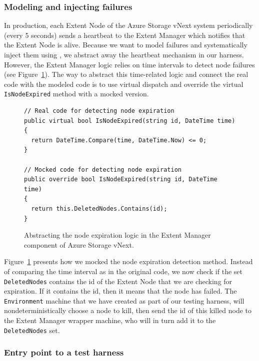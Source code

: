 \subsubsection{Modeling and injecting failures}
\label{sec:method:model:failures}

In production, each Extent Node of the Azure Storage vNext system periodically (every 5 seconds) sends a heartbeat to the Extent Manager which notifies that the Extent Node is alive. Because we want to model failures and systematically inject them using \psharp, we abstract away the heartbeat mechanism in our harness. However, the Extent Manager logic relies on time intervals to detect node failures (see Figure~\ref{fig:expiration}). The way to abstract this time-related logic and connect the real code with the modeled code is to use virtual dispatch and override the virtual \texttt{IsNodeExpired} method with a mocked version.

\begin{figure}[t]
\begin{lstlisting}
// Real code for detecting node expiration
public virtual bool IsNodeExpired(string id, DateTime time)
{
  return DateTime.Compare(time, DateTime.Now) <= 0;
}

// Mocked code for detecting node expiration
public override bool IsNodeExpired(string id, DateTime time)
{
  return this.DeletedNodes.Contains(id);
}
\end{lstlisting}
\vspace{-2mm}
\caption{Abstracting the node expiration logic in the Extent Manager component of Azure Storage vNext.}
\label{fig:expiration}
\end{figure}

Figure~\ref{fig:expiration} presents how we mocked the node expiration detection method. Instead of comparing the time interval as in the original code, we now check if the set \texttt{DeletedNodes} contains the id of the Extent Node that we are checking for expiration. If it contains the id, then it means that the node has failed. The \texttt{Environment} machine that we have created as part of our testing \psharp harness, will nondeterministically choose a node to kill, then send the id of this killed node to the Extent Manager wrapper machine, who will in turn add it to the \texttt{DeletedNodes} set.

\subsubsection{Entry point to a \psharp test harness}
\label{sec:method:model:entrypoint}

